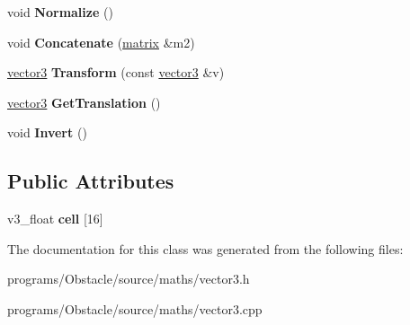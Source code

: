 \begin{DoxyCompactItemize}
\item 
void {\bfseries Normalize} ()\hypertarget{classns__phys_1_1matrix_a910ce1bbb2f9b12ef230e0a51b1d2c14}{}\label{classns__phys_1_1matrix_a910ce1bbb2f9b12ef230e0a51b1d2c14}

\item 
void {\bfseries Concatenate} (\hyperlink{classns__phys_1_1matrix}{matrix} \&m2)\hypertarget{classns__phys_1_1matrix_ae92987c0a83fcbcc1881786d9f4252cd}{}\label{classns__phys_1_1matrix_ae92987c0a83fcbcc1881786d9f4252cd}

\item 
\hyperlink{classns__phys_1_1vector3}{vector3} {\bfseries Transform} (const \hyperlink{classns__phys_1_1vector3}{vector3} \&v)\hypertarget{classns__phys_1_1matrix_a06684679fca48a4a384ec912beccc694}{}\label{classns__phys_1_1matrix_a06684679fca48a4a384ec912beccc694}

\item 
\hyperlink{classns__phys_1_1vector3}{vector3} {\bfseries Get\+Translation} ()\hypertarget{classns__phys_1_1matrix_a9395155e2063b98c35e2f5fc5bdee2ea}{}\label{classns__phys_1_1matrix_a9395155e2063b98c35e2f5fc5bdee2ea}

\item 
void {\bfseries Invert} ()\hypertarget{classns__phys_1_1matrix_acc9f8918ea3650a108d221117a6f46ae}{}\label{classns__phys_1_1matrix_acc9f8918ea3650a108d221117a6f46ae}

\end{DoxyCompactItemize}
\subsection*{Public Attributes}
\begin{DoxyCompactItemize}
\item 
v3\+\_\+float {\bfseries cell} \mbox{[}16\mbox{]}\hypertarget{classns__phys_1_1matrix_ad68556a7eb354da8d1124606ea05f067}{}\label{classns__phys_1_1matrix_ad68556a7eb354da8d1124606ea05f067}

\end{DoxyCompactItemize}


The documentation for this class was generated from the following files\+:\begin{DoxyCompactItemize}
\item 
programs/\+Obstacle/source/maths/vector3.\+h\item 
programs/\+Obstacle/source/maths/vector3.\+cpp\end{DoxyCompactItemize}
